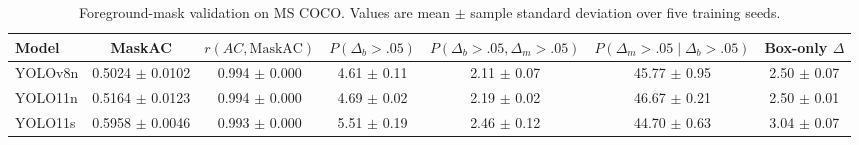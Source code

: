 \begin{table}[t]
\centering
\caption{Foreground-mask validation on MS COCO. Values are mean $\pm$ sample standard deviation over five training seeds.}
\label{tab:mask_grounded_validity}
\begin{tabular}{lcccccc}
\hline
Model & MaskAC & $r(AC,\mathrm{MaskAC})$ & $P(\Delta_b>.05)$ & $P(\Delta_b>.05,\Delta_m>.05)$ & $P(\Delta_m>.05\mid\Delta_b>.05)$ & Box-only $\Delta$ \\
\hline
YOLOv8n & 0.5024 $\pm$ 0.0102 & 0.994 $\pm$ 0.000 & 4.61 $\pm$ 0.11 & 2.11 $\pm$ 0.07 & 45.77 $\pm$ 0.95 & 2.50 $\pm$ 0.07 \\
YOLO11n & 0.5164 $\pm$ 0.0123 & 0.994 $\pm$ 0.000 & 4.69 $\pm$ 0.02 & 2.19 $\pm$ 0.02 & 46.67 $\pm$ 0.21 & 2.50 $\pm$ 0.01 \\
YOLO11s & 0.5958 $\pm$ 0.0046 & 0.993 $\pm$ 0.000 & 5.51 $\pm$ 0.19 & 2.46 $\pm$ 0.12 & 44.70 $\pm$ 0.63 & 3.04 $\pm$ 0.07 \\
\hline
\end{tabular}
\end{table}
